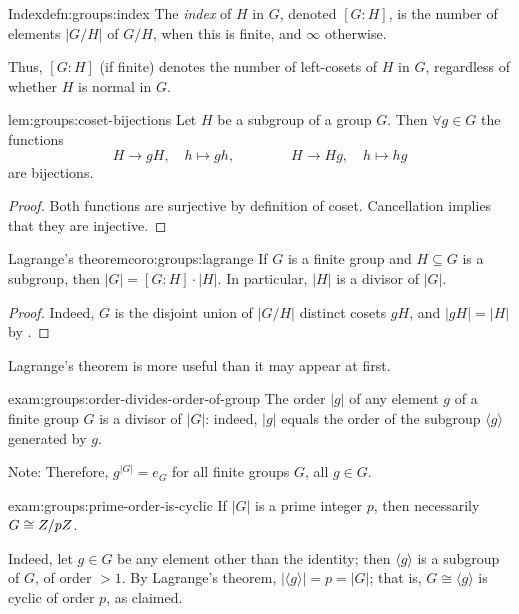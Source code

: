 \begin{defn}{Index}{defn:groups:index}
  The \emph{index} of $H$ in $G$, denoted $[G:H]$, is the number of
  elements $|G/H|$ of $G/H$, when this is finite, and $\infty$
  otherwise.
\end{defn}

Thus, $[G:H]$ (if finite) denotes the number of left-cosets of $H$ in
$G$, regardless of whether $H$ is normal in $G$.

\begin{lem}{}{lem:groups:coset-bijections}
  Let $H$ be a subgroup of a group $G$. Then $\forall g \in G$
the functions
\[
  H \to gH, \quad h \mapsto gh, \qquad\qquad H \to Hg, \quad h \mapsto hg
\]
are bijections.
\end{lem}
\begin{proof}
  Both functions are surjective by definition of coset. Cancellation
  implies that they are injective.
\end{proof}

\begin{coro}{Lagrange's theorem}{coro:groups:lagrange}
  If $G$ is a finite group and
  $H \subseteq G$ is a subgroup, then $|G| = [G:H] \cdot |H|$. In
  particular, $|H|$ is a divisor of $|G|$.
\end{coro}
\begin{proof}
  Indeed, $G$ is the disjoint union of $|G/H|$ distinct cosets $gH$,
  and $|gH| = |H|$ by .
\end{proof}

Lagrange's theorem is more useful than it may appear at first.

\begin{exam}{}{exam:groups:order-divides-order-of-group}
  The order $|g|$ of any element $g$ of a finite group $G$ is a
  divisor of $|G|$: indeed, $|g|$ equals the order of the subgroup
  $\langle g \rangle$ generated by $g$.

  Note: Therefore, $g^{|G|} = e_G$ for all finite groups $G$, all
  $g \in G$.
\end{exam}

\begin{exam}{}{exam:groups:prime-order-is-cyclic}
  If $|G|$ is a prime integer $p$, then necessarily $G \cong Z/pZ$.

  Indeed, let $g \in G$ be any element other than the identity; then
  $\langle g \rangle$ is a subgroup of $G$, of order $> 1$. By
  Lagrange's theorem, $|\langle g \rangle| = p = |G|$; that is,
  $G \cong \langle g \rangle$ is cyclic of order $p$, as claimed.
\end{exam}

